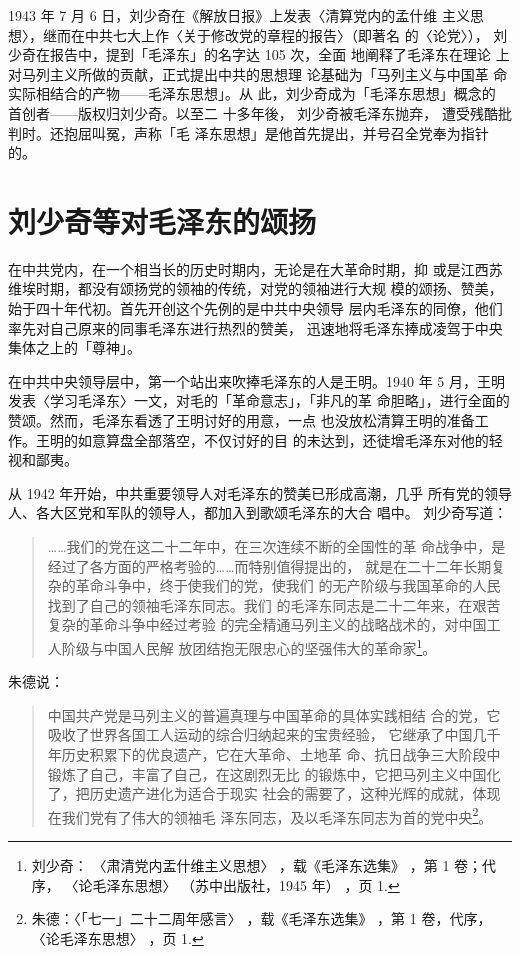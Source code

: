1943 年 7 月 6 日，刘少奇在《解放日报》上发表〈清算党内的孟什维 主义思
想〉，继而在中共七大上作〈关于修改党的章程的报告〉（即著名 的〈论党〉），
刘少奇在报告中，提到「毛泽东」的名字达 105 次，全面 地阐释了毛泽东在理论
上对马列主义所做的贡献，正式提出中共的思想理 论基础为「马列主义与中国革
命实际相结合的产物——毛泽东思想」。从 此，刘少奇成为「毛泽东思想」概念的
首创者——版权归刘少奇。以至二 十多年後， 刘少奇被毛泽东抛弃， 遭受残酷批
判时。还抱屈叫冤，声称「毛 泽东思想」是他首先提出，并号召全党奉为指针的。

\section{刘少奇等对毛泽东的颂扬}

在中共党内，在一个相当长的历史时期内，无论是在大革命时期，抑
或是江西苏维埃时期，都没有颂扬党的领袖的传统，对党的领袖进行大规
模的颂扬、赞美，始于四十年代初。首先开创这个先例的是中共中央领导
层内毛泽东的同僚，他们率先对自己原来的同事毛泽东进行热烈的赞美，
迅速地将毛泽东捧成凌驾于中央集体之上的「尊神」。

在中共中央领导层中，第一个站出来吹捧毛泽东的人是王明。1940 年
5 月，王明发表〈学习毛泽东〉一文，对毛的「革命意志」，「非凡的革
命胆略」，进行全面的赞颂。然而，毛泽东看透了王明讨好的用意，一点
也没放松清算王明的准备工作。王明的如意算盘全部落空，不仅讨好的目
的未达到，还徒增毛泽东对他的轻视和鄙夷。

从 1942 年开始，中共重要领导人对毛泽东的赞美已形成高潮，几乎
所有党的领导人、各大区党和军队的领导人，都加入到歌颂毛泽东的大合
唱中。
刘少奇写道：
\begin{quote}
	\fzwkai ……我们的党在这二十二年中，在三次连续不断的全国性的革
命战争中，是经过了各方面的严格考验的……而特别值得提出的，
就是在二十二年长期复杂的革命斗争中，终于使我们的党，使我们
的无产阶级与我国革命的人民找到了自己的领袖毛泽东同志。我们
的毛泽东同志是二十二年来，在艰苦复杂的革命斗争中经过考验
的完全精通马列主义的战略战术的，对中国工人阶级与中国人民解
放团结抱无限忠心的坚强伟大的革命家\footnote{刘少奇：
〈肃清党内盂什维主义思想〉
，载《毛泽东选集》
，第 1 卷；代序，
〈论毛泽东思想〉
（苏中出版社，1945
年）
，页 1.}。
\end{quote}

朱德说：
\begin{quote}
	\fzwkai 中国共产党是马列主义的普遍真理与中国革命的具体实践相结
合的党，它吸收了世界各国工人运动的综合归纳起来的宝贵经验，
它继承了中国几千年历史积累下的优良遗产，它在大革命、土地革
命、抗日战争三大阶段中锻炼了自己，丰富了自己，在这剧烈无比
的锻炼中，它把马列主义中国化了，把历史遗产进化为适合于现实
社会的需要了，这种光辉的成就，体现在我们党有了伟大的领袖毛
泽东同志，及以毛泽东同志为首的党中央\footnote{朱德：〈「七一」二十二周年感言〉
，载《毛泽东选集》
，第 1 卷，代序，
〈论毛泽东思想〉
，页 1.}。
\end{quote}

